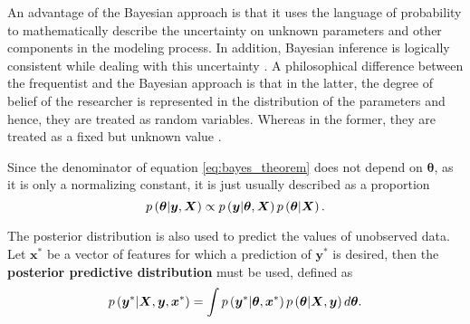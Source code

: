 An advantage of the Bayesian approach is that it uses the language of probability to mathematically describe the uncertainty on unknown parameters and other components in the modeling process.
In addition, Bayesian inference is logically consistent while dealing with this uncertainty \cite{cox1946probability, cox1963algebra, jaynes2003probability, o2004advanced}. A philosophical difference between the frequentist and the Bayesian approach is that in the latter, the degree of belief of the researcher is represented in the distribution of the parameters and hence, they are treated as random variables. Whereas in the former, they are treated as a fixed but unknown value \cite{o2004advanced}.

Since the denominator of equation \eqref{eq:bayes_theorem} does not depend on $\boldsymbol{\theta}$, as it is only a normalizing constant, it is just usually described as a proportion
\begin{equation}
  \label{eq:bayes_theorem_prop}
    p\left( \boldsymbol{\theta} | \boldsymbol{y}, \boldsymbol{X} \right) \propto p\left( \boldsymbol{y} | \boldsymbol{\theta}, \boldsymbol{X} \right) p\left( \boldsymbol{\theta} | \boldsymbol{X} \right).
\end{equation}

The posterior distribution is also used to predict the values of unobserved data. Let $\boldsymbol{x}^*$ be a vector of features for which a prediction of $\boldsymbol{y}^*$ is desired, then the \textbf{posterior predictive distribution} must be used, defined as
\begin{equation}
  \label{eq:post_pred_dist}
  p\left( \boldsymbol{y}^* | \boldsymbol{X}, \boldsymbol{y}, \boldsymbol{x}^* \right) = \int p\left( \boldsymbol{y}^* | \boldsymbol{\theta}, \boldsymbol{x}^* \right) p\left( \boldsymbol{\theta} | \boldsymbol{X}, \boldsymbol{y} \right) d\boldsymbol{\theta}.
\end{equation}

